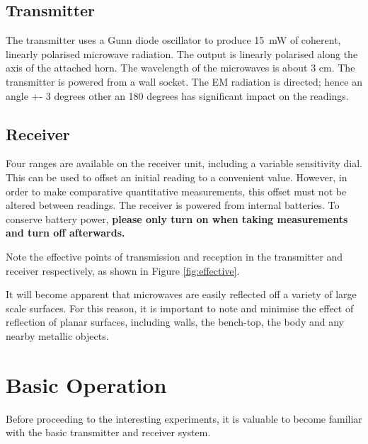 \documentclass{article}
\begin{document}
\subsection*{Transmitter}
The transmitter uses a Gunn diode oscillator to produce 15~mW of coherent, linearly polarised microwave radiation. The output is linearly polarised along the axis of the attached horn. The wavelength of the microwaves is about 3 cm. The transmitter is powered from a wall socket. The EM radiation is directed; hence an angle +- 3 degrees other an 180 degrees has significant impact on the readings.



\subsection*{Receiver}

Four ranges are available on the receiver unit, including a variable sensitivity dial. This can be used to offset an initial reading to a convenient value. However, in order to make comparative quantitative measurements, this offset must not be altered between readings. The receiver is powered from internal batteries. To conserve battery power, \textbf{please only turn on when taking measurements and turn off afterwards.}

Note the effective points of transmission and reception in the transmitter and receiver respectively, as shown in Figure \ref{fig:effective}.




It will become apparent that microwaves are easily reflected off a variety of large scale surfaces. For this reason, it is important to note and minimise the effect of reflection of planar surfaces, including walls, the bench-top, the body and any nearby metallic objects.

\section*{Basic Operation}
Before proceeding to the interesting experiments, it is valuable to become familiar with the basic transmitter and receiver system. 
\end{document}
